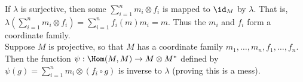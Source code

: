 \documentclass[11pt]{article}
\begin{document}
If $\lambda$ is surjective, then some $\sum_{i=1}^n m_i\otimes f_i$ is mapped to $\id_M$ by $\lambda$. That is, $\lambda(\sum_{i=1}^n m_i\otimes f_i)=\sum_{i=1}^n f_i(m)m_i=m$. Thus the $m_i$ and $f_i$ form a coordinate family.\\

Suppose $M$ is projective, so that $M$ has a coordinate family $m_1,\ldots,m_n,f_1,\ldots,f_n$. Then the function $\psi:\Hom(M,M)\rightarrow M\otimes M^*$ defined by $\psi(g)=\sum_{i=1}^n m_i\otimes (f_i\circ g)$ is inverse to $\lambda$ (proving this is a mess).


\end{document}
